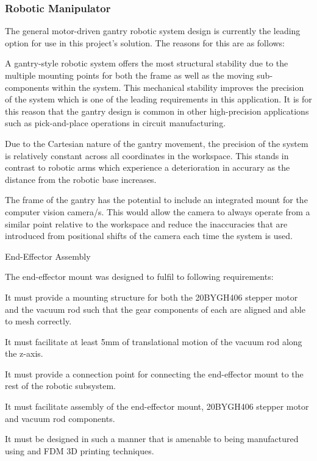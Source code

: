 \subsubsection{Robotic Manipulator}

The general motor-driven gantry robotic system design is currently the leading option for use in this project's solution. The reasons for this are as follows:

\begin{compactitem}
	\item A gantry-style robotic system offers the most structural stability due to the multiple mounting points for both the frame as well as the moving sub-components within the system. This mechanical stability improves the precision of the system which is one of the leading requirements in this application. It is for this reason that the gantry design is common in other high-precision applications such as pick-and-place operations in circuit manufacturing.
	\item Due to the Cartesian nature of the gantry movement, the precision of the system is relatively constant across all coordinates in the workspace. This stands in contrast to robotic arms which experience a deterioration in accurary as the distance from the robotic base increases.
	\item The frame of the gantry has the potential to include an integrated mount for the computer vision camera/s. This would allow the camera to always operate from a similar point relative to the workspace and reduce the inaccuracies that are introduced from positional shifts of the camera each time the system is used.
\end{compactitem}

End-Effector Assembly

The end-effector mount was designed to fulfil to following requirements:

\begin{compactitem}
	\item It must provide a mounting structure for both the 20BYGH406 stepper motor and the vacuum rod such that the gear components of each are aligned and able to mesh correctly.
	\item It must facilitate at least 5mm of translational motion of the vacuum rod along the z-axis.
	\item It must provide a connection point for connecting the end-effector mount to the rest of the robotic subsystem.
	\item It must facilitate assembly of the end-effector mount, 20BYGH406 stepper motor and vacuum rod components.
	\item It must be designed in such a manner that is amenable to being manufactured using and FDM 3D printing techniques. 
\end{compactitem}

